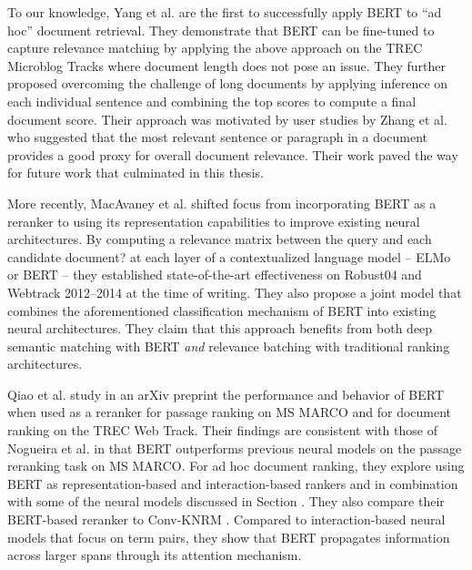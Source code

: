 To our knowledge, Yang et al. \cite{yang2019simple} are the first to successfully apply BERT to ``ad hoc'' document retrieval.
They demonstrate that BERT can be fine-tuned to capture relevance matching by applying the above approach on the TREC Microblog Tracks where document length does not pose an issue.
They further proposed overcoming the challenge of long documents by applying inference on each individual sentence and combining the top scores to compute a final document score.
Their approach was motivated by user studies by Zhang et al. \cite{zhang2018effective} who suggested that the most relevant sentence or paragraph in a document provides a good proxy for overall document relevance.
Their work paved the way for future work that culminated in this thesis.

More recently, MacAvaney et al. \cite{macavaney2019cedr} shifted focus from incorporating BERT as a reranker to using its representation capabilities to improve existing neural architectures.
By computing a relevance matrix between the query and each candidate document? at each layer of a contextualized language model -- ELMo or BERT --  they established state-of-the-art effectiveness on Robust04 and Webtrack 2012--2014 at the time of writing.
They also propose a joint model that combines the aforementioned classification mechanism of BERT into existing neural architectures.
They claim that this approach benefits from both deep semantic matching with BERT \textit{and} relevance batching with traditional ranking architectures.

Qiao et al. \cite{Qiao:1904.07531:2019} study in an arXiv preprint the performance and behavior of BERT when used as a reranker for passage ranking on MS MARCO and for document ranking on the TREC Web Track.
Their findings are consistent with those of Nogueira et al. \cite{nogueira2019passage} in that BERT outperforms previous neural models on the passage reranking task on MS MARCO.
For ad hoc document ranking, they explore using BERT as representation-based and interaction-based rankers and in combination with some of the neural models discussed in Section .
They also compare their BERT-based reranker to Conv-KNRM \cite{dai2018convolutional}.
Compared to interaction-based neural models that focus on term pairs, they show that BERT propagates information across larger spans through its attention mechanism.


